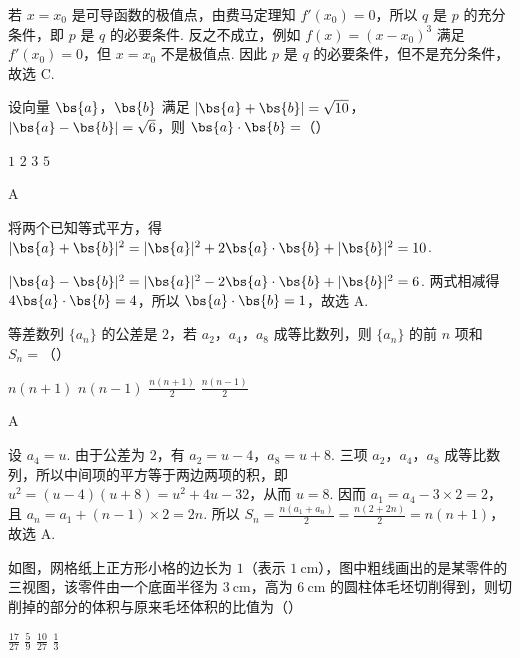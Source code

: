 \begin{solution}
若 \(x=x_0\) 是可导函数的极值点，由费马定理知 \(f'(x_0)=0\)，所以 \(q\) 是 \(p\) 的充分条件，即 \(p\) 是 \(q\) 的必要条件. 反之不成立，例如 \(f(x)=(x-x_0)^3\) 满足 \(f'(x_0)=0\)，但 \(x=x_0\) 不是极值点. 因此 \(p\) 是 \(q\) 的必要条件，但不是充分条件，故选 C.
\end{solution}

\begin{problem}
设向量 \(\bs{a}\)，\(\bs{b}\) 满足 \(|\bs{a}+\bs{b}|=\sqrt{10}\)，\(|\bs{a}-\bs{b}|=\sqrt{6}\)，则 \(\bs{a}\cdot\bs{b}=\)（\quad）

\choices
    {\(1\)}
    {\(2\)}
    {\(3\)}
    {\(5\)}
\end{problem}

\begin{answer}
A
\end{answer}

\begin{solution}
将两个已知等式平方，得
\(|\bs{a}+\bs{b}|^2=|\bs{a}|^2+2\bs{a}\cdot\bs{b}+|\bs{b}|^2=10\).

\(|\bs{a}-\bs{b}|^2=|\bs{a}|^2-2\bs{a}\cdot\bs{b}+|\bs{b}|^2=6\).
两式相减得 \(4\bs{a}\cdot\bs{b}=4\)，所以 \(\bs{a}\cdot\bs{b}=1\)，故选 A.
\end{solution}

\begin{problem}
等差数列 \(\{a_n\}\) 的公差是 \(2\)，若 \(a_2\)，\(a_4\)，\(a_8\) 成等比数列，则 \(\{a_n\}\) 的前 \(n\) 项和 \(S_n=\)（\quad）

\choices
    {\(n(n+1)\)}
    {\(n(n-1)\)}
    {\(\frac{n(n+1)}{2}\)}
    {\(\frac{n(n-1)}{2}\)}
\end{problem}

\begin{answer}
A
\end{answer}

\begin{solution}
设 \(a_4=u\). 由于公差为 \(2\)，有 \(a_2=u-4\)，\(a_8=u+8\). 三项 \(a_2\)，\(a_4\)，\(a_8\) 成等比数列，所以中间项的平方等于两边两项的积，即
\(u^2=(u-4)(u+8)=u^2+4u-32\)，从而 \(u=8\). 因而 \(a_1=a_4-3\times2=2\)，且 \(a_n=a_1+(n-1)\times2=2n\). 所以
\(S_n=\frac{n(a_1+a_n)}{2}=\frac{n(2+2n)}{2}=n(n+1)\)，故选 A.
\end{solution}

\begin{problem}
如图，网格纸上正方形小格的边长为 \(1\)（表示 \(1\mathrm{~cm}\)），图中粗线画出的是某零件的三视图，该零件由一个底面半径为 \(3\mathrm{~cm}\)，高为 \(6\mathrm{~cm}\) 的圆柱体毛坯切削得到，则切削掉的部分的体积与原来毛坯体积的比值为（\quad）


\choices
    {\(\frac{17}{27}\)}
    {\(\frac{5}{9}\)}
    {\(\frac{10}{27}\)}
    {\(\frac{1}{3}\)}
\end{problem}

